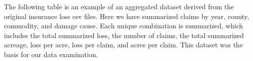 \documentclass[]{article}
\newenvironment{Shaded}{\begin{snugshade}}{\end{snugshade}}
\newcommand{\DataTypeTok}[1]{\textcolor[rgb]{0.13,0.29,0.53}{#1}}
\newcommand{\DecValTok}[1]{\textcolor[rgb]{0.00,0.00,0.81}{#1}}
\newcommand{\KeywordTok}[1]{\textcolor[rgb]{0.13,0.29,0.53}{\textbf{#1}}}
\newcommand{\NormalTok}[1]{#1}
\newcommand{\OperatorTok}[1]{\textcolor[rgb]{0.81,0.36,0.00}{\textbf{#1}}}
\newcommand{\StringTok}[1]{\textcolor[rgb]{0.31,0.60,0.02}{#1}}
\begin{document}
The following table is an example of an aggregated dataset derived from
the original insurance loss csv files. Here we have summarized claims by
year, county, commodity, and damage cause. Each unique combination is
summarized, which includes the total summarized loss, the number of
claims, the total summarized acreage, loss per acre, loss per claim, and
acres per claim. This dataset was the basis for our data examination.

\begin{Shaded}
\end{Shaded}
\end{document}
